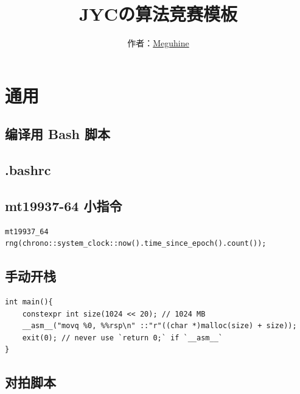 \documentclass[12pt]{article}
\theoremstyle{definition}
\theoremstyle{remark}
\begin{document}
\title{\vspace{-2cm}\textbf{\huge{JYCの算法竞赛模板}}}
\author{作者：\href{https://codeforces.com/profile/Meguhine}{Meguhine}}
\date{}
\maketitle

\tableofcontents

\newpage

{\centering\section{通用}}

\subsection{编译用 Bash 脚本}



\subsection{.bashrc}



\subsection{mt19937-64 小指令}

\begin{lstlisting}[style=C++]
mt19937_64 rng(chrono::system_clock::now().time_since_epoch().count());
\end{lstlisting}

\subsection{手动开栈}

\begin{lstlisting}[style=C++]
int main(){
	constexpr int size(1024 << 20); // 1024 MB
	__asm__("movq %0, %%rsp\n" ::"r"((char *)malloc(size) + size));
	exit(0); // never use `return 0;` if `__asm__`
}
\end{lstlisting}

\newpage

\subsection{对拍脚本}
\end{document}
